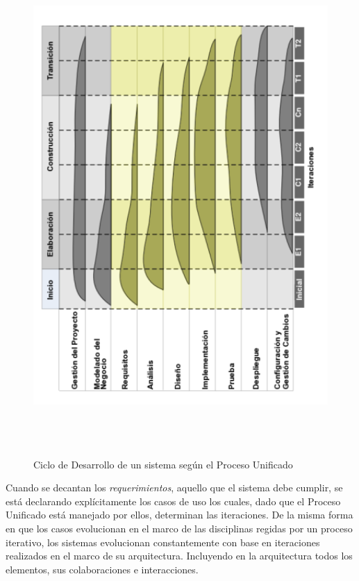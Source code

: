 \begin{figure}
 \centering
 \includegraphics[width=140mm, height=190mm]{pu.png}
 \caption{Ciclo de Desarrollo de un sistema según el Proceso Unificado}
 \label{proceso_unificado}
\end{figure}

Cuando se decantan los \textit{requerimientos}, aquello que el sistema debe cumplir, se está declarando explícitamente los casos de uso los cuales, dado que el Proceso Unificado está manejado por ellos, determinan las iteraciones. De la misma forma en que los casos evolucionan en el marco de las disciplinas regidas por un proceso iterativo, los sistemas evolucionan constantemente con base en iteraciones realizados en el marco de su arquitectura. Incluyendo en la arquitectura todos los elementos, sus colaboraciones e interacciones.  

